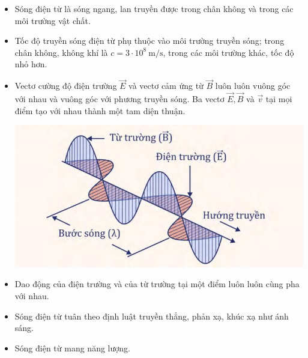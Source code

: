 \begin{itemize}
	\item Sóng điện từ là sóng ngang, lan truyền được trong chân không và trong các môi trường vật chất.
	\item Tốc độ truyền sóng điện từ phụ thuộc vào môi trường truyền sóng; trong chân không, không khí là $c=3\cdot 10^8\ \text{m/s}$, trong các môi trường khác, tốc độ nhỏ hơn.
	\item Vectơ cường độ điện trường $\vec{E}$ và vectơ cảm ứng từ $\vec {B}$ luôn luôn vuông góc với nhau và vuông góc với phương truyền sóng. Ba vectơ $\vec{E}, \vec{B}$ và $\vec{v}$ tại mọi điểm tạo với nhau thành một tam diện thuận.
	\begin{center}
		\includegraphics[scale=0.7]{../figs/4-3-1.JPG}
	\end{center}
	\item Dao động của điện trường và của từ trường tại một điểm luôn luôn cùng pha với nhau.
	\item Sóng điện từ tuân theo định luật truyền thẳng, phản xạ, khúc xạ như ánh sáng.
	\item Sóng điện từ mang năng lượng.

\end{itemize}
